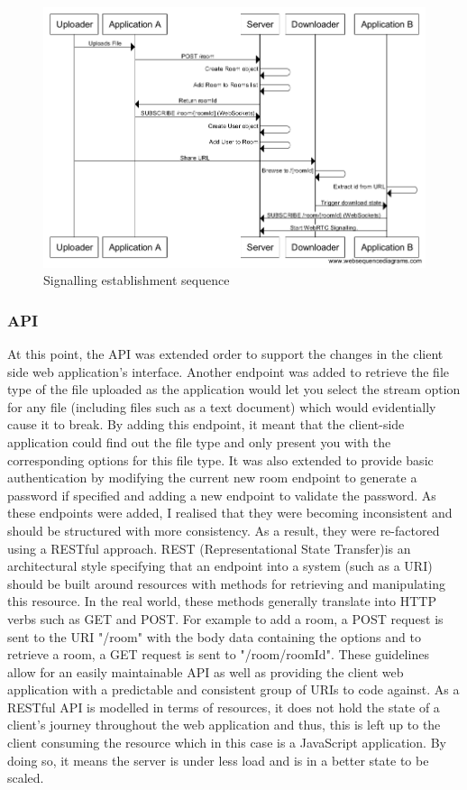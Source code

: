 \documentclass[]{report}
\begin{document}
				\begin{figure}[H]
					\caption{Signalling establishment sequence}
					\centering
					\includegraphics[scale=0.5]{signalling-establishment-sequence.png}
				\end{figure}
				
				\subsubsection*{API}
				At this point, the API was extended order to support the changes in the client side web application's interface. Another endpoint was added to retrieve the file type of the file uploaded as the application would let you select the stream option for any file (including files such as a text document) which would evidentially cause it to break. By adding this endpoint, it meant that the client-side application could find out the file type and only present you with the corresponding options for this file type. It was also extended to provide basic authentication by modifying the current new room endpoint to generate a password if specified and adding a new endpoint to validate the password. As these endpoints were added, I realised that they were becoming inconsistent and should be structured with more consistency. As a result, they were re-factored using a RESTful approach. REST (Representational State Transfer)is an architectural style specifying that an endpoint into a system (such as a URI) should be built around resources with methods for retrieving and manipulating this resource. In the real world, these methods generally translate into HTTP verbs such as GET and POST. For example to add a room, a POST request is sent to the URI "/room" with the body data containing the options and to retrieve a room, a GET request is sent to "/room/{roomId}". These guidelines allow for an easily maintainable API as well as providing the client web application with a predictable and consistent group of URIs to code against. As a RESTful API is modelled in terms of resources, it does not hold the state of a client's journey throughout the web application and thus, this is left up to the client consuming the resource which in this case is a JavaScript application. By doing so, it means the server is under less load and is in a better state to be scaled.
				
\end{document}
